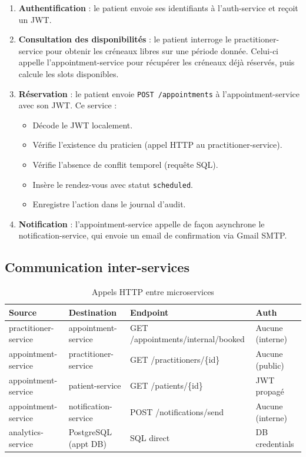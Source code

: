 \documentclass[12pt,a4paper]{article}
\begin{document}
\begin{enumerate}
  \item \textbf{Authentification} : le patient envoie ses identifiants à l'auth-service et reçoit un JWT.
  \item \textbf{Consultation des disponibilités} : le patient interroge le practitioner-service pour obtenir les créneaux libres sur une période donnée. Celui-ci appelle l'appointment-service pour récupérer les créneaux déjà réservés, puis calcule les slots disponibles.
  \item \textbf{Réservation} : le patient envoie \texttt{POST /appointments} à l'appointment-service avec son JWT. Ce service :
  \begin{itemize}
    \item Décode le JWT localement.
    \item Vérifie l'existence du praticien (appel HTTP au practitioner-service).
    \item Vérifie l'absence de conflit temporel (requête SQL).
    \item Insère le rendez-vous avec statut \texttt{scheduled}.
    \item Enregistre l'action dans le journal d'audit.
  \end{itemize}
  \item \textbf{Notification} : l'appointment-service appelle de façon asynchrone le notification-service, qui envoie un email de confirmation via Gmail SMTP.
\end{enumerate}

\subsection{Communication inter-services}

\begin{table}[H]
\centering
\caption{Appels HTTP entre microservices}
\begin{tabularx}{\textwidth}{L{3.5cm} L{3.5cm} X L{2.5cm}}
\toprule
\textbf{Source} & \textbf{Destination} & \textbf{Endpoint} & \textbf{Auth} \\
\midrule
practitioner-service & appointment-service & GET /appointments/internal/booked & Aucune (interne) \\
appointment-service & practitioner-service & GET /practitioners/\{id\} & Aucune (public) \\
appointment-service & patient-service & GET /patients/\{id\} & JWT propagé \\
appointment-service & notification-service & POST /notifications/send & Aucune (interne) \\
analytics-service & PostgreSQL (appt DB) & SQL direct & DB credentials \\
\bottomrule
\end{tabularx}
\end{table}
\end{document}
